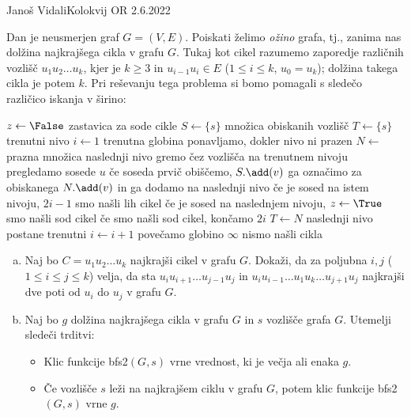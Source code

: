 \begin{naloga}{Janoš Vidali}{Kolokvij OR 2.6.2022}
\begin{vprasanje}
Dan je neusmerjen graf $G = (V, E)$.
Poiskati želimo {\em ožino} grafa,
tj., zanima nas dolžina najkrajšega cikla v grafu $G$.
Tukaj kot cikel razumemo zaporedje različnih vozlišč $u_1 u_2 \dots u_k$,
kjer je $k \ge 3$ in $u_{i-1} u_i \in E$ ($1 \le i \le k$, $u_0 = u_k$);
dolžina takega cikla je potem $k$.
Pri reševanju tega problema
si bomo pomagali s sledečo različico iskanja v širino:
\begin{small}
\begin{algorithmic}
	\State $z \gets \False$ \hfill zastavica za sode cikle
	\State $S \gets \{s\}$ \hfill množica obiskanih vozlišč
	\State $T \gets \{s\}$ \hfill trenutni nivo
	\State $i \gets 1$ \hfill trenutna globina
	 \hfill ponavljamo, dokler nivo ni prazen
		\State $N \gets$ prazna množica \hfill naslednji nivo
		 \hfill gremo čez vozlišča na trenutnem nivoju
			 \hfill pregledamo sosede $u$
				 \hfill če soseda prvič obiščemo,
					\State $S.\add(v)$ \hfill ga označimo za obiskanega
					\State $N.\add(v)$ \hfill in ga dodamo na naslednji nivo
				 \hfill če je sosed na istem nivoju,
					\State \Return $2i - 1$ \hfill smo našli lih cikel
				 \hfill če je sosed na naslednjem nivoju,
					\State $z \gets \True$ \hfill smo našli sod cikel
				\EndIf
			\EndFor
		\EndFor
		 \hfill če smo našli sod cikel, končamo
			\State \Return $2i$
		\EndIf
		\State $T \gets N$ \hfill naslednji nivo postane trenutni
		\State $i \gets i + 1$ \hfill povečamo globino
	\EndWhile
	\State \Return $\infty$ \hfill nismo našli cikla
\EndFunction
\end{algorithmic}
\end{small}

\begin{enumerate}[(a)]
\item Naj bo $C = u_1 u_2 \dots u_k$ najkrajši cikel v grafu $G$.
Dokaži, da za poljubna $i, j$ ($1 \le i \le j \le k$) velja,
da sta $u_i u_{i+1} \dots u_{j-1} u_j$
in $u_i u_{i-1} \dots u_1 u_k \dots u_{j+1} u_j$
najkrajši dve poti od $u_i$ do $u_j$ v grafu $G$.

\item Naj bo $g$ dolžina najkrajšega cikla v grafu $G$
in $s$ vozlišče grafa $G$.
Utemelji sledeči trditvi:
\begin{itemize}
\itemsep 0mm
\item Klic funkcije {\sc bfs2}$(G, s)$ vrne vrednost, ki je večja ali enaka $g$.
\item Če vozlišče $s$ leži na najkrajšem ciklu v grafu $G$,
potem klic funkcije {\sc bfs2}$(G, s)$ vrne $g$.
\end{itemize}


\end{enumerate}
\end{vprasanje}
\end{naloga}
